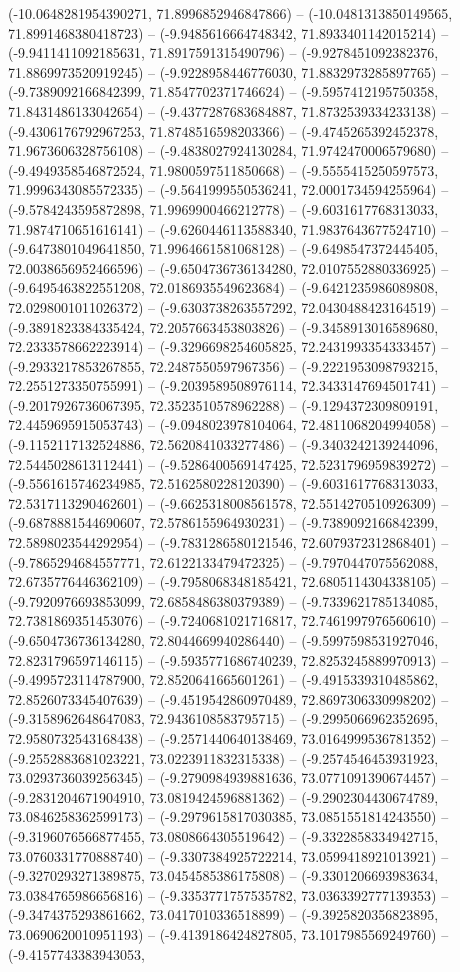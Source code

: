 (-10.0648281954390271, 71.8996852946847866) -- (-10.0481313850149565, 71.8991468380418723) -- (-9.9485616664748342, 71.8933401142015214) -- (-9.9411411092185631, 71.8917591315490796) -- (-9.9278451092382376, 71.8869973520919245) -- (-9.9228958446776030, 71.8832973285897765) -- (-9.7389092166842399, 71.8547702371746624) -- (-9.5957412195750358, 71.8431486133042654) -- (-9.4377287683684887, 71.8732539334233138) -- (-9.4306176792967253, 71.8748516598203366) -- (-9.4745265392452378, 71.9673606328756108) -- (-9.4838027924130284, 71.9742470006579680) -- (-9.4949358546872524, 71.9800597511850668) -- (-9.5555415250597573, 71.9996343085572335) -- (-9.5641999550536241, 72.0001734594255964) -- (-9.5784243595872898, 71.9969900466212778) -- (-9.6031617768313033, 71.9874710651616141) -- (-9.6260446113588340, 71.9837643677524710) -- (-9.6473801049641850, 71.9964661581068128) -- (-9.6498547372445405, 72.0038656952466596) -- (-9.6504736736134280, 72.0107552880336925) -- (-9.6495463822551208, 72.0186935549623684) -- (-9.6421235986089808, 72.0298001011026372) -- (-9.6303738263557292, 72.0430488423164519) -- (-9.3891823384335424, 72.2057663453803826) -- (-9.3458913016589680, 72.2333578662223914) -- (-9.3296698254605825, 72.2431993354333457) -- (-9.2933217853267855, 72.2487550597967356) -- (-9.2221953098793215, 72.2551273350755991) -- (-9.2039589508976114, 72.3433147694501741) -- (-9.2017926736067395, 72.3523510578962288) -- (-9.1294372309809191, 72.4459695915053743) -- (-9.0948023978104064, 72.4811068204994058) -- (-9.1152117132524886, 72.5620841033277486) -- (-9.3403242139244096, 72.5445028613112441) -- (-9.5286400569147425, 72.5231796959839272) -- (-9.5561615746234985, 72.5162580228120390) -- (-9.6031617768313033, 72.5317113290462601) -- (-9.6625318008561578, 72.5514270510926309) -- (-9.6878881544690607, 72.5786155964930231) -- (-9.7389092166842399, 72.5898023544292954) -- (-9.7831286580121546, 72.6079372312868401) -- (-9.7865294684557771, 72.6122133479472325) -- (-9.7970447075562088, 72.6735776446362109) -- (-9.7958068348185421, 72.6805114304338105) -- (-9.7920976693853099, 72.6858486380379389) -- (-9.7339621785134085, 72.7381869351453076) -- (-9.7240681021716817, 72.7461997976560610) -- (-9.6504736736134280, 72.8044669940286440) -- (-9.5997598531927046, 72.8231796597146115) -- (-9.5935771686740239, 72.8253245889970913) -- (-9.4995723114787900, 72.8520641665601261) -- (-9.4915339310485862, 72.8526073345407639) -- (-9.4519542860970489, 72.8697306330998202) -- (-9.3158962648647083, 72.9436108583795715) -- (-9.2995066962352695, 72.9580732543168438) -- (-9.2571440640138469, 73.0164999536781352) -- (-9.2552883681023221, 73.0223911832315338) -- (-9.2574546453931923, 73.0293736039256345) -- (-9.2790984939881636, 73.0771091390674457) -- (-9.2831204671904910, 73.0819424596881362) -- (-9.2902304430674789, 73.0846258362599173) -- (-9.2979615817030385, 73.0851551814243550) -- (-9.3196076566877455, 73.0808664305519642) -- (-9.3322858334942715, 73.0760331770888740) -- (-9.3307384925722214, 73.0599418921013921) -- (-9.3270293271389875, 73.0454585386175808) -- (-9.3301206693983634, 73.0384765986656816) -- (-9.3353771757535782, 73.0363392777139353) -- (-9.3474375293861662, 73.0417010336518899) -- (-9.3925820356823895, 73.0690620010951193) -- (-9.4139186424827805, 73.1017985569249760) -- (-9.4157743383943053, 